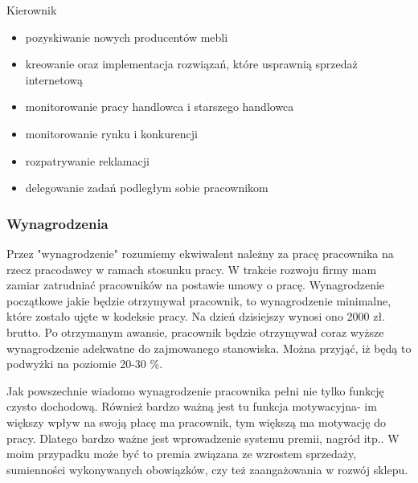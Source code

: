 			\par Kierownik
				\begin{itemize}
					\item pozyskiwanie nowych producentów mebli
					\item kreowanie oraz implementacja rozwiązań, które usprawnią sprzedaż internetową
					\item monitorowanie pracy handlowca i starszego handlowca
					\item monitorowanie rynku i konkurencji
					\item rozpatrywanie reklamacji
					\item delegowanie zadań podległym sobie pracownikom
				\end{itemize}

				
		\subsubsection{Wynagrodzenia}
			\par Przez "wynagrodzenie" rozumiemy ekwiwalent należny za pracę pracownika na rzecz pracodawcy w ramach stosunku pracy. W trakcie rozwoju firmy mam zamiar zatrudniać pracowników na postawie umowy o pracę. Wynagrodzenie początkowe jakie będzie otrzymywał pracownik, to wynagrodzenie minimalne, które zostało ujęte w kodeksie pracy. Na dzień dzisiejszy wynosi ono 2000 zł. brutto. Po otrzymanym awansie, pracownik będzie otrzymywał coraz wyższe wynagrodzenie adekwatne do zajmowanego stanowiska. Można przyjąć, iż będą to podwyżki na poziomie 20-30 \%.
			
			\par Jak powszechnie wiadomo wynagrodzenie pracownika pełni nie tylko funkcję czysto dochodową. Również bardzo ważną jest tu funkcja motywacyjna- im większy wpływ na swoją płacę ma pracownik, tym większą ma motywację do pracy. Dlatego bardzo ważne jest wprowadzenie systemu premii, nagród itp.. W moim przypadku może być to premia związana ze wzrostem sprzedaży, sumienności wykonywanych obowiązków, czy też zaangażowania w rozwój sklepu.
